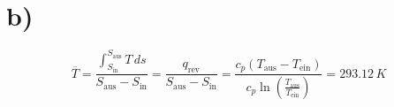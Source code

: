 

\section*{b)}

\[
\overline{T} = \frac{\int_{S_{\text{in}}}^{S_{\text{aus}}} T \, ds}{S_{\text{aus}} - S_{\text{in}}} = \frac{q_{\text{rev}}}{S_{\text{aus}} - S_{\text{in}}} = \frac{c_p (T_{\text{aus}} - T_{\text{ein}})}{c_p \ln \left( \frac{T_{\text{aus}}}{T_{\text{ein}}} \right)} = 293.12 \, K
\]